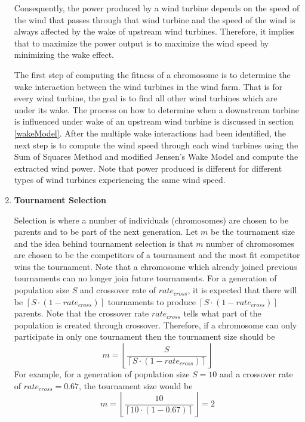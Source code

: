 \begin{enumerate}
                    Consequently, the power produced by a wind turbine depends on the speed of the wind that passes through that wind turbine and the speed of the wind is always affected by the wake of upstream wind turbines. Therefore, it implies that to maximize the power output is to maximize the wind speed by minimizing the wake effect.
                    
                    The first step of computing the fitness of a chromosome is to determine the wake interaction between the wind turbines in the wind farm. That is for every wind turbine, the goal is to find all other wind turbines which are under its wake. The process on how to determine when a downstream turbine is influenced under wake of an upstream wind turbine is discussed in section \ref{wakeModel}. After the multiple wake interactions had been identified, the next step is to compute the wind speed through each wind turbines using the Sum of Squares Method and modified Jensen's Wake Model and compute the extracted wind power. Note that power produced is different for different types of wind turbines experiencing the same wind speed.
                
                \item \textbf{Tournament Selection}
                    \par Selection is where a number of individuals (chromosomes) are chosen to be parents and to be part of the next generation. Let $m$ be the tournament size and the idea behind tournament selection is that $m$ number of chromosomes are chosen to be the competitors of a tournament and the most fit competitor wins the tournament. Note that a chromosome which already joined previous tournaments can no longer join future tournaments. For a generation of population size $S$ and crossover rate of $rate_{cross}$, it is expected that there will be $\left \lceil{S\cdot(1-rate_{cross})}\right \rceil$ tournaments to produce $\left \lceil{S\cdot(1-rate_{cross})}\right \rceil$ parents. Note that the crossover rate $rate_{cross}$ tells what part of the population is created through crossover. Therefore, if a chromosome can only participate in only one tournament then the tournament size should be
                    \begin{equation}
                        m=\left \lfloor{\frac{S}{\left \lceil{S\cdot(1-rate_{cross})}\right \rceil}}\right \rfloor
                    \end{equation}
                    For example, for a generation of population size $S=10$ and a crossover rate of $rate_{cross}=0.67$, the tournament size would be
                    \begin{equation}
                        m=\left \lfloor{\frac{10}{\left \lceil{10\cdot(1-0.67)}\right \rceil}}\right \rfloor=2
                    \end{equation}
                    

\end{enumerate}
